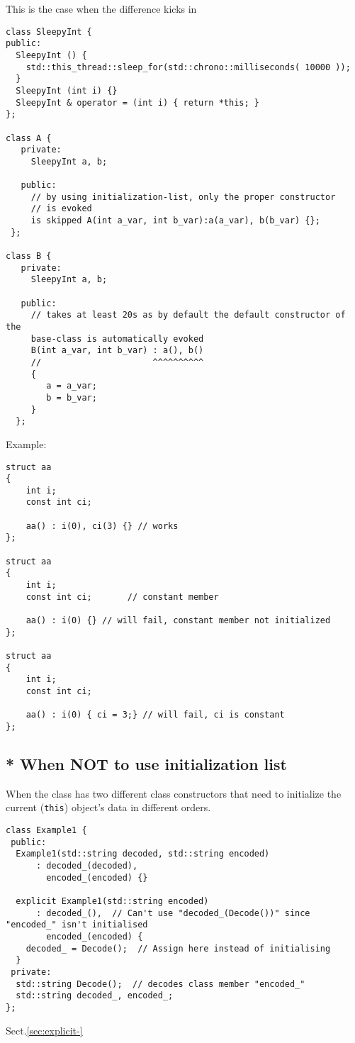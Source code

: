 This is the case when the difference kicks in
\begin{verbatim}
class SleepyInt {
public:
  SleepyInt () { 
    std::this_thread::sleep_for(std::chrono::milliseconds( 10000 ));  
  }
  SleepyInt (int i) {}
  SleepyInt & operator = (int i) { return *this; }
};

class A {
   private:
     SleepyInt a, b;

   public:
     // by using initialization-list, only the proper constructor
     // is evoked
     is skipped A(int a_var, int b_var):a(a_var), b(b_var) {}; 
 };

class B {
   private:
     SleepyInt a, b;

   public:
     // takes at least 20s as by default the default constructor of the
     base-class is automatically evoked 
     B(int a_var, int b_var) : a(), b()
     //                      ^^^^^^^^^^ 
     {
        a = a_var;
        b = b_var;
     }
  };
\end{verbatim}


Example: 

\begin{verbatim}
struct aa
{
    int i;
    const int ci;

    aa() : i(0), ci(3) {} // works
};

struct aa
{
    int i;
    const int ci;       // constant member

    aa() : i(0) {} // will fail, constant member not initialized
};

struct aa
{
    int i;
    const int ci;

    aa() : i(0) { ci = 3;} // will fail, ci is constant
};
\end{verbatim}


\subsection{ * When NOT to use initialization list}

When the class has two different class constructors that need to initialize
the current (\verb!this!) object's data in different orders.
\begin{verbatim}
class Example1 {
 public:
  Example1(std::string decoded, std::string encoded)
      : decoded_(decoded),
        encoded_(encoded) {}
  
  explicit Example1(std::string encoded)
      : decoded_(),  // Can't use "decoded_(Decode())" since "encoded_" isn't initialised
        encoded_(encoded) {
    decoded_ = Decode();  // Assign here instead of initialising
  }
 private:
  std::string Decode();  // decodes class member "encoded_"
  std::string decoded_, encoded_;
};
\end{verbatim}
Sect.\ref{sec:explicit-}

